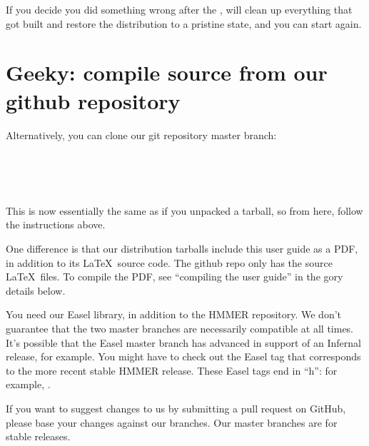   \vspace{1ex}
  \vspace{1ex}

If you decide you did something wrong after the ,
 will clean up everything that got built and
restore the distribution to a pristine state, and you can start again.


\section{Geeky: compile source from our github repository}

Alternatively, you can clone our git repository master
branch:
  
  \vspace{1ex}
   \\
   \\
   \\
  \vspace{1ex}

This is now essentially the same as if you unpacked a tarball, so from
here, follow the  instructions above.

One difference is that our distribution tarballs include this user
guide as a PDF, in addition to its \LaTeX\ source code. The github
repo only has the source \LaTeX\ files. To compile the PDF, see
``compiling the user guide'' in the gory details below.

You need our Easel library, in addition to the HMMER repository. We
don't guarantee that the two master branches are necessarily
compatible at all times. It's possible that the Easel master branch
has advanced in support of an Infernal release, for example. You might
have to check out the Easel tag that corresponds to the more recent
stable HMMER release. These Easel tags end in ``h'': for example,
.

If you want to suggest changes to us by submitting a pull request on
GitHub, please base your changes against our  branches.
Our master branches are for stable releases.



